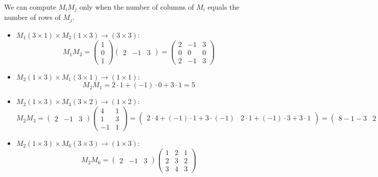 \documentclass{article}
\begin{document}
We can compute \( M_i M_j \) only when the number of columns of \( M_i \) equals the number of rows of \( M_j \).

\begin{itemize}
    \item \( M_1 (3 \times 1) \times M_2 (1 \times 3) \to (3 \times 3) \):
    \[
    M_1 M_2 = \begin{pmatrix} 1 \\ 0 \\ 1 \end{pmatrix} \begin{pmatrix} 2 & -1 & 3 \end{pmatrix}
    = \begin{pmatrix}
        2 & -1 & 3 \\
        0 & 0 & 0 \\
        2 & -1 & 3
    \end{pmatrix}
    \]
    \item \( M_2 (1 \times 3) \times M_1 (3 \times 1) \to (1 \times 1) \):
    \[
    M_2 M_1 = 2 \cdot 1 + (-1) \cdot 0 + 3 \cdot 1 = 5
    \]
    \item \( M_2 (1 \times 3) \times M_3 (3 \times 2) \to (1 \times 2) \):
    \[
    M_2 M_3 = \begin{pmatrix} 2 & -1 & 3 \end{pmatrix} \begin{pmatrix} 4 & 1 \\ 1 & 3 \\ -1 & 1 \end{pmatrix}
    = \begin{pmatrix}
        2 \cdot 4 + (-1) \cdot 1 + 3 \cdot (-1) & 2 \cdot 1 + (-1) \cdot 3 + 3 \cdot 1
    \end{pmatrix}
    = \begin{pmatrix}
        8 - 1 - 3 & 2 - 3 + 3
    \end{pmatrix}
    = \begin{pmatrix}
        4 & 2
    \end{pmatrix}
    \]
    \item \( M_2 (1 \times 3) \times M_6 (3 \times 3) \to (1 \times 3) \):
    \[
    M_2 M_6 = \begin{pmatrix} 2 & -1 & 3 \end{pmatrix}
    \begin{pmatrix}
        1 & 2 & 1 \\
        2 & 3 & 2 \\
        3 & 4 & 3
    \end{pmatrix}
\]
\end{itemize}
\end{document}
